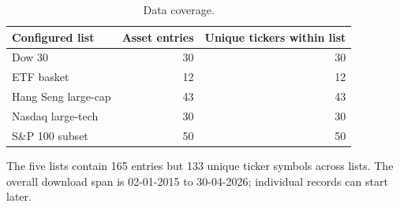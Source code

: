 \begin{table}[htbp]
\centering
\caption{Data coverage.}
\label{tab:dataset_coverage}
\small
\setlength{\tabcolsep}{4pt}
\begin{tabular}{lrr}
\toprule
Configured list & Asset entries & Unique tickers within list \\
\midrule
Dow 30 & 30 & 30 \\
ETF basket & 12 & 12 \\
Hang Seng large-cap & 43 & 43 \\
Nasdaq large-tech & 30 & 30 \\
S\&P 100 subset & 50 & 50 \\
\bottomrule
\end{tabular}
\par\smallskip\parbox{0.97\linewidth}{\footnotesize The five lists contain 165 entries but 133 unique ticker symbols across lists. The overall download span is 02-01-2015 to 30-04-2026; individual records can start later.}
\end{table}
